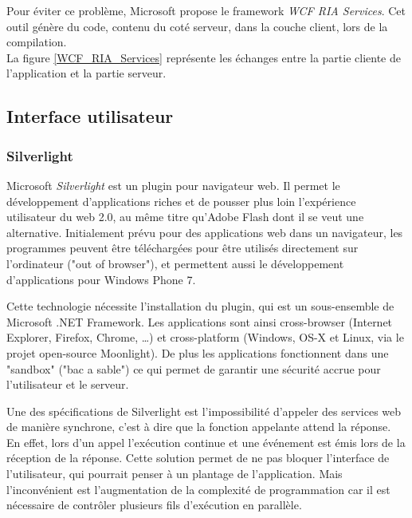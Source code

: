 Pour éviter ce problème, Microsoft propose le framework \textit{WCF RIA Services}. Cet outil génère du code, contenu du coté serveur, dans la couche client, lors de la compilation.
\\


La figure \ref{WCF_RIA_Services} représente les échanges entre la partie cliente de l'application et la partie serveur.


\subsection{Interface utilisateur}


\subsubsection{Silverlight}

Microsoft \textit{Silverlight} est un plugin pour navigateur web. Il permet le développement d'applications riches et de pousser plus loin l'expérience utilisateur du web 2.0, au même titre qu'Adobe Flash dont il se veut une alternative. Initialement prévu pour des applications web dans un navigateur, les programmes peuvent être téléchargées pour être utilisés directement sur l'ordinateur ("out of browser"), et permettent aussi le développement d'applications pour Windows Phone 7.

Cette technologie nécessite l'installation du plugin, qui est un sous-ensemble de Microsoft .NET Framework. Les applications sont ainsi cross-browser (Internet Explorer, Firefox, Chrome, \ldots) et cross-platform (Windows, OS-X et Linux, via le projet open-source Moonlight). De plus les applications fonctionnent dans une "sandbox" ("bac a sable") ce qui permet de garantir une sécurité accrue pour l'utilisateur et le serveur.

Une des spécifications de Silverlight est l'impossibilité d'appeler des services web de manière synchrone, c'est à dire que la fonction appelante attend la réponse. En effet, lors d'un appel l'exécution continue et une événement est émis lors de la réception de la réponse. Cette solution permet de ne pas bloquer l'interface de l'utilisateur, qui pourrait penser à un plantage de l'application. Mais l'inconvénient est l'augmentation de la complexité de programmation car il est nécessaire de contrôler plusieurs fils d'exécution en parallèle.

